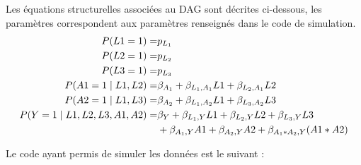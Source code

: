 \documentclass[
]{book}
\begin{document}
Les équations structurelles associées au DAG sont décrites ci-dessous, les paramètres correspondent aux paramètres renseignés dans le code de simulation.
\begin{align*}
\small P(L1 = 1) =& p_{L_1} \\
\small P(L2 = 1) =& p_{L_2} \\
\small P(L3 = 1) =& p_{L_3} \\
\small P(A1 = 1 \mid L1, L2) =& \beta_{A_1} + \beta_{L_1,A_1} L1 + \beta_{L_2,A_1} L2 \\
\small P(A2 = 1 \mid L1, L3) =& \beta_{A_2} + \beta_{L_1,A_2} L1 + \beta_{L_3,A_2} L3 \\
\small P(Y = 1 \mid L1, L2, L3, A1, A2) =& \beta_{Y} + \beta_{L_1,Y} L1 + \beta_{L_2,Y} L2 + \beta_{L_3,Y} L3 \\
                  & + \beta_{A_1,Y} A1 + \beta_{A_2,Y} A2 + \beta_{A_1 \ast A_2,Y} (A1 \ast A2)
\end{align*}

Le code ayant permis de simuler les données est le suivant :
\end{document}
